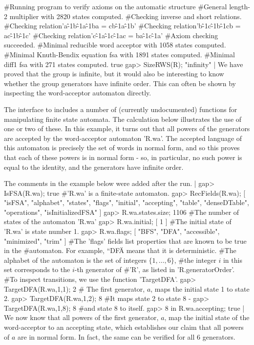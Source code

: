     #Running program to verify axioms on the automatic structure
    #General length-2 multiplier with 2820 states computed.
    #Checking inverse and short relations.
    #Checking relation\:\hspace{2mm}'a\^-1\*b\^-1\*a\^-1\*b\*a = c\*b\^-1\*a\^-1\*b'
    #Checking relation\:\hspace{2mm}'b\^-1\*c\^-1\*b\^-1\*c\*b = a\*c\^-1\*b\^-1\*c'
    #Checking relation\:\hspace{2mm}'c\^-1\*a\^-1\*c\^-1\*a\*c = b\*a\^-1\*c\^-1\*a'
    #Axiom checking succeeded.
    #Minimal reducible word acceptor with 1058 states computed.
    #Minimal Knuth-Bendix equation fsa with 1891 states computed.
    #Minimal diff1 fsa with 271 states computed.
    true
    gap> SizeRWS(R);
    "infinity"
|
We  have proved  that the group   is  infinite, but  it  would also be
interesting  to know  whether   the  group  generators have   infinite
order.    This  can often be   shown   by inspecting the word-acceptor
automaton directly.

The  {\GAP}  interface  to {\KBMAG}  includes a  number  of (currently
undocumented)  functions for manipulating   finite state automata. The
calculation below illustrates the use of one or  two of these. In this
example, it turns out that  all powers of  the generators are accepted
by  the word-acceptor automaton 'R.wa'.  The accepted language of this
automaton  is precisely the set of  words in normal  form, and so this
proves  that  each of   these   powers is  in   normal  form - so,  in
particular, no such power is equal to the identity, and the generators
have infinite order.

The comments in the example below were added after the run.
|
    gap> IsFSA(R.wa);
    true  #'R.wa' is a finite-state automaton.
    gap> RecFields(R.wa);
    [ "isFSA", "alphabet", "states", "flags", "initial",
      "accepting", "table", "denseDTable", "operations",
      "isInitializedFSA" ]
    gap> R.wa.states.size;
    1106	#The number of states of the automaton 'R.wa'
    gap> R.wa.initial;
    [ 1 ]   #The initial state of 'R.wa' is state number 1.
    gap> R.wa.flags;
    [ "BFS", "DFA", "accessible", "minimized", "trim" ]
    #The 'flags' fields list properties that are known to be true in the
    #automaton. For example, {``DFA\"} means that it is deterministic.
    #The alphabet of the automaton is the set of integers $\{1, \ldots, 6 \}$,
    #the integer $i$ in this set corresponds to the $i$-th generator of
    #'R', as listed in 'R.generatorOrder'.
    #To inspect transitions, we use the function 'TargetDFA'.
    gap> TargetDFA(R.wa,1,1);
    2   # The first generator, $a$, maps the initial state 1 to state 2.
    gap> TargetDFA(R.wa,1,2);
    8   #It maps state 2 to state 8 -
    gap> TargetDFA(R.wa,1,8);
    8   #and state 8 to itself.
    gap> 8 in R.wa.accepting;
    true
|
We now  know  that all powers  of  the first generator,  $a$,  map the
initial state  of the  word-acceptor  to  an accepting   state,  which
establishes our  claim that all powers of  $a$ are in  normal form. In
fact, the same can be verified for all 6 generators.

